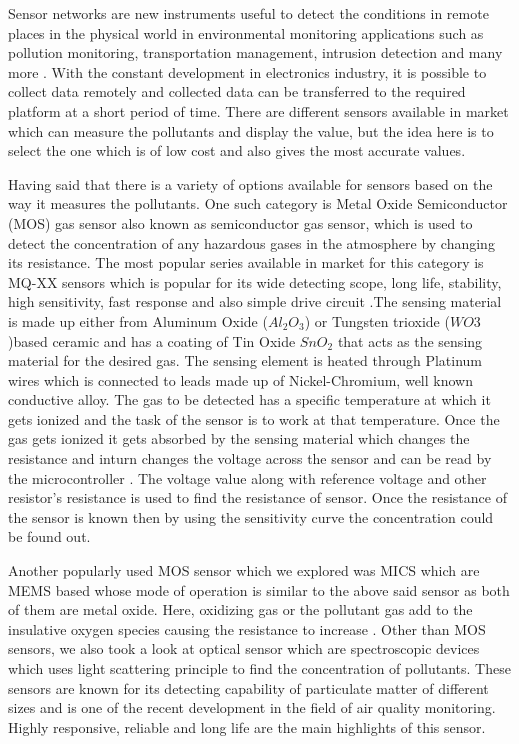 \documentclass[12pt,a4paper,oneside]{report}
\begin{document}
Sensor networks are new instruments useful to detect the conditions in remote places in the physical world in environmental monitoring applications such as pollution monitoring, transportation management, intrusion detection and many more \cite{Jung2011}. With the constant development in electronics industry, it is possible to collect data remotely and collected data can be transferred to the required platform at a short period of time.
There are different sensors available in market which can measure the pollutants and display the value, but the idea here is to select the one which is of low cost and also gives the most accurate values.
\par
Having said that there is a variety of options available for sensors based on the way it measures the pollutants. One such category is Metal Oxide Semiconductor (MOS) gas sensor also known as semiconductor gas sensor, which is used to detect the concentration of any hazardous gases in the atmosphere by changing its resistance. The most popular series available in market for this category is MQ-XX sensors which is popular for its wide detecting scope, long life, stability, high sensitivity, fast response and also simple drive circuit \cite{Data2012}.The sensing material is made up either from Aluminum Oxide ($ Al_{2}O_{3}$) or Tungsten trioxide ($WO3$)based ceramic and has a coating of Tin Oxide $ SnO_{2} $ that acts as the sensing material for the desired gas. The sensing element is heated through Platinum wires which is connected to leads made up of Nickel-Chromium, well known conductive alloy. The gas to be detected has a specific temperature at which it gets ionized and the task of the sensor is to work at that temperature. Once the gas gets ionized it gets absorbed by the sensing material which changes the resistance and inturn changes the voltage across the sensor and can be read by the microcontroller \cite{gassensor}. The voltage value along with reference voltage and other resistor's resistance is used to find the resistance of sensor. Once the resistance of the sensor is known then by using the sensitivity curve the concentration could be found out. 

Another popularly used  MOS sensor which we explored was MICS which are MEMS based whose mode of operation is similar to the above said sensor as both of them are metal oxide. Here, oxidizing gas or the pollutant gas add to the insulative oxygen species causing the resistance to increase \cite{SGXSensortech}.
 Other than MOS sensors, we also took a look at optical sensor which are spectroscopic devices which uses light scattering principle to find the concentration of pollutants. These sensors are known for its detecting capability of particulate matter of different sizes and is one of the recent development in the field of air quality monitoring. Highly responsive, reliable and long life are the main highlights of this sensor.
\end{document}
